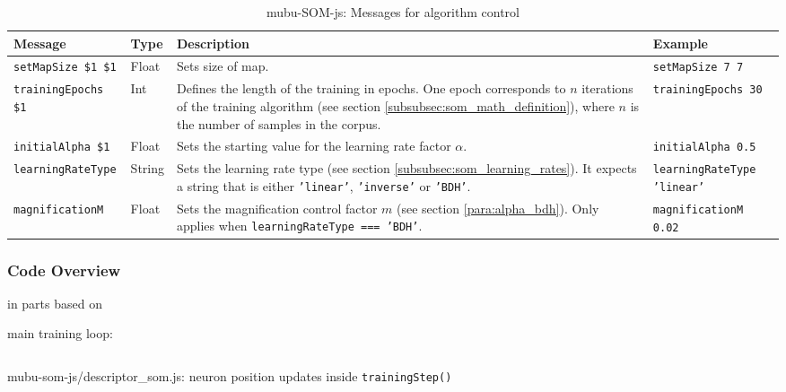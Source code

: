 \begin{table}[!ht]
  \renewcommand{\arraystretch}{1.2}
  \centering
  \footnotesize
  \begin{tabular}{ l | l | p{4.2cm} | p{3.1cm}}
    \textbf{Message} & \textbf{Type} & \textbf{Description}
    & \textbf{Example} \\
    \hline
    \texttt{setMapSize \$1 \$1} & Float & Sets size of map.
    & \texttt{setMapSize 7 7} \\
    \texttt{trainingEpochs \$1}
    & Int
    & Defines the length of the training in epochs. One epoch corresponds to
    $n$ iterations of the training algorithm (see section
    \ref{subsubsec:som_math_definition}), where $n$ is the number of samples in
    the corpus.
    & \texttt{trainingEpochs 30} \\
    \texttt{initialAlpha \$1}
    & Float
    & Sets the starting value for the learning
    rate factor $\alpha$.
    & \texttt{initialAlpha 0.5} \\
    \texttt{learningRateType}
    & String
    & Sets the learning rate type (see section
    \ref{subsubsec:som_learning_rates}). It expects a string that is either
    \texttt{'linear'}, \texttt{'inverse'} or
    \texttt{'BDH'}.
    & \texttt{learningRateType 'linear'} \\
    \texttt{magnificationM}
    & Float
    & Sets the magnification control factor $m$ (see section
    \ref{para:alpha_bdh}). Only applies when
    \texttt{learningRateType === 'BDH'}.
    & \texttt{magnificationM 0.02}
  \end{tabular}
  \caption{mubu-SOM-js: Messages for algorithm control}
  \label{table:catart_som_messages}
\end{table}

\subsubsection{Code Overview}
\label{subsubsec:mubu-som_overview}

in parts based on \citet{vesanto2000}

main training loop:

\begin{listing}[!htb]
  \begin{mdframed}
    \inputminted[breaklines, numbers=left, firstline=306, lastline=312,
    fontsize=\footnotesize]{js}{../dev/mubu-som-js/descriptor_som.js}
  \end{mdframed}
  \caption{mubu-som-js/descriptor\_som.js: neuron position updates inside
  \texttt{trainingStep()}}
\end{listing}

